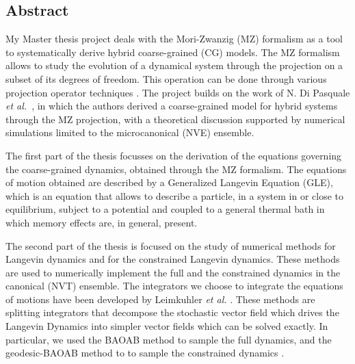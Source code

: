 \documentclass[10pt,a4paper]{book}
\theoremstyle{definition}
\begin{document}


\frontmatter

 
\begin{center}
\section*{Abstract}
\end{center}

My Master thesis project deals with the Mori-Zwanzig (MZ) formalism as a tool to systematically derive hybrid coarse-grained (CG) models. The MZ formalism allows to study the evolution of a dynamical system through the projection on a subset of its degrees of freedom. This operation can be done through various projection operator techniques \cite{Grabert:Projection}. 
%
The project builds on the work of N. Di Pasquale \emph{et al.}~\cite{DiPasquale2019}, in which the authors derived a coarse-grained model for hybrid systems through the MZ projection, with a theoretical discussion supported by numerical simulations limited to the microcanonical (NVE) ensemble.
%


The first part of the thesis focusses on the derivation of the equations governing the coarse-grained dynamics, obtained through the MZ formalism.
The equations of motion obtained are described by a Generalized Langevin Equation (GLE), which is an equation that allows to describe a particle, in a system in or close to equilibrium, subject to a potential and coupled to a general thermal bath in which memory effects are, in general, present.

The second part of the thesis is focused on the study of numerical methods for Langevin dynamics and for the constrained Langevin dynamics. These methods are used to numerically implement the full and the constrained dynamics in the canonical (NVT) ensemble. The integrators we choose to integrate the equations of motions have been developed by Leimkuhler \emph{et al.} \cite{LeimMatt:LAnDynInt,Leimkuhler2016}. These methods are splitting integrators that decompose the stochastic vector field which drives the Langevin Dynamics into simpler vector fields which can be solved exactly. In particular, we used the BAOAB method to sample the full dynamics\cite{LeimMatt:LAnDynInt}, and the geodesic-BAOAB method to to sample the constrained dynamics \cite{Leimkuhler2016}.
\end{document}
